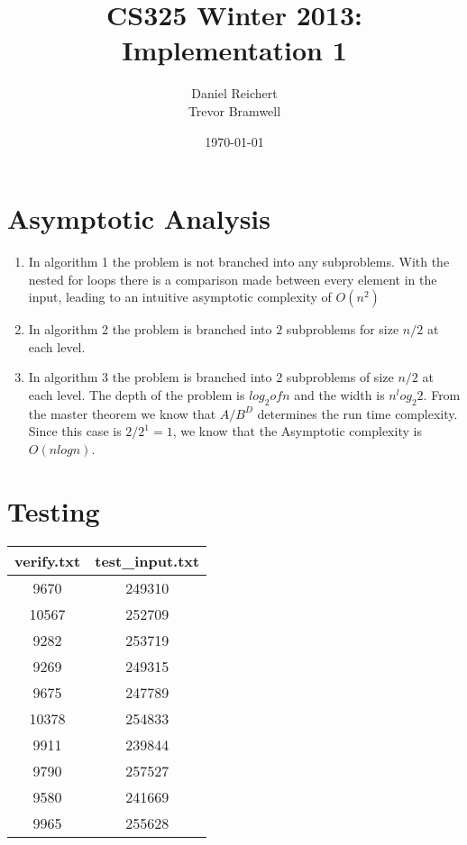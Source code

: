 \documentclass[12pt]{article}
\title{CS325 Winter 2013: Implementation 1}
\author{
    Daniel Reichert \\
    Trevor Bramwell
}
\date{\today}
\begin{document}
\maketitle

\section*{Asymptotic Analysis}
    \begin{enumerate}

    \item In algorithm 1 the problem is not branched into any subproblems.
          With the nested for loops there is a comparison made between
          every element in the input, leading to an intuitive asymptotic
          complexity of $O(n^2)$

	\item In algorithm 2 the problem is branched into $2$ subproblems
          for size $n/2$ at each level.

    \item In algorithm 3 the problem is branched into $2$ subproblems of size
          $n/2$ at each level.  The depth of the problem is $log_2 of n$
          and the width is $n^log_2 2$.  From the master theorem we know
          that $A/B^D$ determines the run time complexity.  Since this
          case is $2/2^1 = 1$, we know that the Asymptotic complexity is
          $O(n log n)$.

    \end{enumerate}

\section*{Testing}

\begin{center}
\begin{tabular}{|c|c|}
\hline
verify.txt & test\_input.txt \\ \hline
9670  & 249310 \\ \hline
10567 & 252709 \\ \hline 
9282  & 253719 \\ \hline 
9269  & 249315 \\ \hline 
9675  & 247789 \\ \hline 
10378 & 254833 \\ \hline 
9911  & 239844 \\ \hline 
9790  & 257527 \\ \hline 
9580  & 241669 \\ \hline 
9965  & 255628 \\
\hline
\end{tabular}
\end{center}
\end{document}

